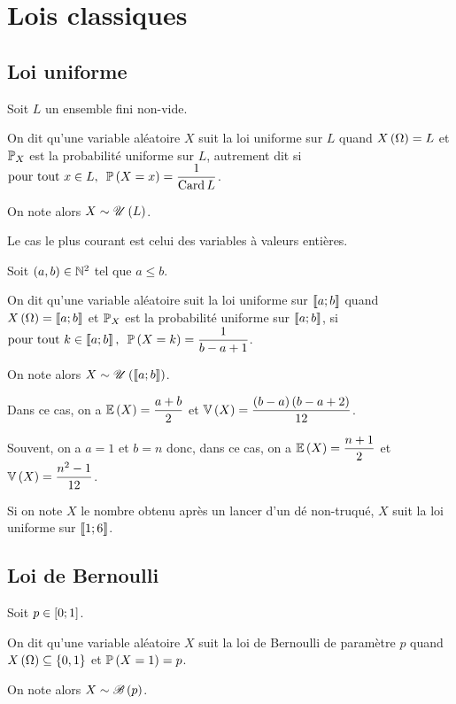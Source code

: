 \section{Lois classiques}

\subsection{Loi uniforme}

\begin{defi}
Soit \(L\) un ensemble fini non-vide.

On dit qu'une variable aléatoire \(X\) suit la loi uniforme sur \(L\) quand \(X\left(\Omega\right)=L\) et \(\mathbb{P}_X\) est la probabilité uniforme sur \(L\), autrement dit si \(\quantifs{\tpt x\in L}\proba{X=x}=\dfrac{1}{\Card L}\).

On note alors \(X\sim\mathscr{U}\left(L\right)\).
\end{defi}

Le cas le plus courant est celui des variables à valeurs entières.

\begin{defi}
Soit \(\left(a,b\right)\in\mathbb{N}^2\) tel que \(a\leq b\).

On dit qu'une variable aléatoire suit la loi uniforme sur \(\left\llbracket a;b\right\rrbracket\) quand \(X\left(\Omega\right)=\left\llbracket a;b\right\rrbracket\) et \(\mathbb{P}_X\) est la probabilité uniforme sur \(\left\llbracket a;b\right\rrbracket\), \ie si \(\quantifs{\tpt k\in\interventierii{a}{b}}\proba{X=k}=\dfrac{1}{b-a+1}\).

On note alors \(X\sim\mathscr{U}\left(\left\llbracket a;b\right\rrbracket\right)\).
\end{defi}

Dans ce cas, on a \(\operatorname{\mathbb{E}}\left(X\right)=\dfrac{a+b}{2}\) et \(\operatorname{\mathbb{V}}\left(X\right)=\dfrac{\left(b-a\right)\left(b-a+2\right)}{12}\).

Souvent, on a \(a=1\) et \(b=n\) donc, dans ce cas, on a \(\operatorname{\mathbb{E}}\left(X\right)=\dfrac{n+1}{2}\) et \(\operatorname{\mathbb{V}}\left(X\right)=\dfrac{n^2-1}{12}\).

\begin{ex}
Si on note \(X\) le nombre obtenu après un lancer d'un dé non-truqué, \(X\) suit la loi uniforme sur \(\left\llbracket1;6\right\rrbracket\).
\end{ex}

\subsection{Loi de Bernoulli}

\begin{defi}
Soit \(p\in\left[0;1\right]\).

On dit qu'une variable aléatoire \(X\) suit la loi de Bernoulli de paramètre \(p\) quand \(X\left(\Omega\right)\subseteq\left\lbrace0,1\right\rbrace\) et \(\mathbb{P}\left(X=1\right)=p\).

On note alors \(X\sim\mathscr{B}\left(p\right)\).
\end{defi}

